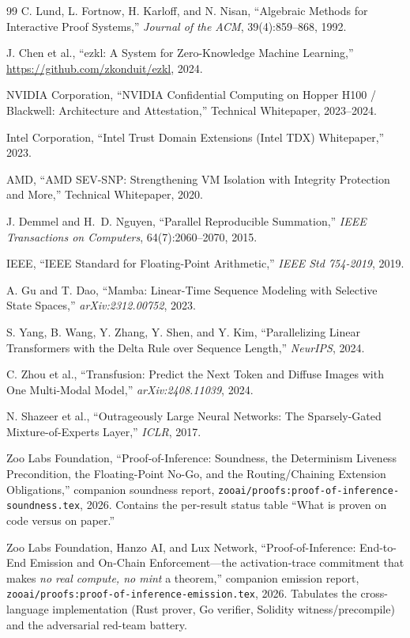 \begin{thebibliography}{99}
C. Lund, L. Fortnow, H. Karloff, and N. Nisan, ``Algebraic Methods for Interactive Proof Systems,'' \textit{Journal of the ACM}, 39(4):859--868, 1992.

J. Chen et al., ``ezkl: A System for Zero-Knowledge Machine Learning,'' \url{https://github.com/zkonduit/ezkl}, 2024.

NVIDIA Corporation, ``NVIDIA Confidential Computing on Hopper H100 / Blackwell: Architecture and Attestation,'' Technical Whitepaper, 2023--2024.

Intel Corporation, ``Intel Trust Domain Extensions (Intel TDX) Whitepaper,'' 2023.

AMD, ``AMD SEV-SNP: Strengthening VM Isolation with Integrity Protection and More,'' Technical Whitepaper, 2020.

J. Demmel and H.~D. Nguyen, ``Parallel Reproducible Summation,'' \textit{IEEE Transactions on Computers}, 64(7):2060--2070, 2015.

IEEE, ``IEEE Standard for Floating-Point Arithmetic,'' \textit{IEEE Std 754-2019}, 2019.

A. Gu and T. Dao, ``Mamba: Linear-Time Sequence Modeling with Selective State Spaces,'' \textit{arXiv:2312.00752}, 2023.

S. Yang, B. Wang, Y. Zhang, Y. Shen, and Y. Kim, ``Parallelizing Linear Transformers with the Delta Rule over Sequence Length,'' \textit{NeurIPS}, 2024.

C. Zhou et al., ``Transfusion: Predict the Next Token and Diffuse Images with One Multi-Modal Model,'' \textit{arXiv:2408.11039}, 2024.

N. Shazeer et al., ``Outrageously Large Neural Networks: The Sparsely-Gated Mixture-of-Experts Layer,'' \textit{ICLR}, 2017.

Zoo Labs Foundation, ``Proof-of-Inference: Soundness, the Determinism Liveness Precondition, the Floating-Point No-Go, and the Routing/Chaining Extension Obligations,'' companion soundness report, \texttt{zooai/proofs:proof-of-inference-soundness.tex}, 2026. Contains the per-result status table ``What is proven on code versus on paper.''

Zoo Labs Foundation, Hanzo AI, and Lux Network, ``Proof-of-Inference: End-to-End Emission and On-Chain Enforcement---the activation-trace commitment that makes \textit{no real compute, no mint} a theorem,'' companion emission report, \texttt{zooai/proofs:proof-of-inference-emission.tex}, 2026. Tabulates the cross-language implementation (Rust prover, Go verifier, Solidity witness/precompile) and the adversarial red-team battery.


\end{thebibliography}
